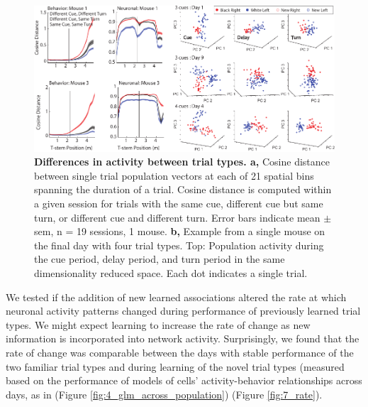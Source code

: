 \begin{figure}
\includegraphics[width=\textwidth]{figures/7_pca_all.pdf}
\caption[Differences in activity between trial types.]{\textbf{Differences in activity between trial types. a,} Cosine distance between single trial population vectors at each of 21 spatial bins spanning the duration of a trial. Cosine distance is computed within a given session for trials with the same cue, different cue but same turn, or different cue and different turn. Error bars indicate mean $\pm$ sem, n = 19 sessions, 1 mouse.
%
\textbf{b,} Example from a single mouse on the final day with four trial types. Top: Population activity during the cue period, delay period, and turn period in the same dimensionality reduced space. Each dot indicates a single trial. 
\label{fig:7_pca_all}}
\end{figure}

We tested if the addition of new learned associations altered the rate at which neuronal activity patterns changed during performance of previously learned trial types. We might expect learning to increase the rate of change as new information is incorporated into network activity. Surprisingly, we found that the rate of change was comparable between the days with stable performance of the two familiar trial types and during learning of the novel trial types (measured based on the performance of models of cells' activity-behavior relationships across days, as in (Figure  \ref{fig:4_glm_across_population}) (Figure \ref{fig:7_rate}).

